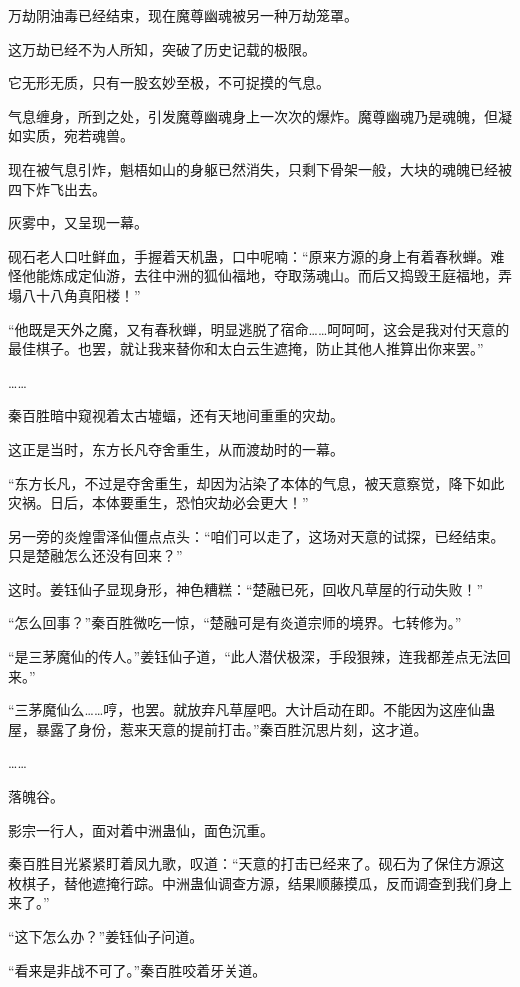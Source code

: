 \begin{this_body}
万劫阴油毒已经结束，现在魔尊幽魂被另一种万劫笼罩。

这万劫已经不为人所知，突破了历史记载的极限。

它无形无质，只有一股玄妙至极，不可捉摸的气息。

气息缠身，所到之处，引发魔尊幽魂身上一次次的爆炸。魔尊幽魂乃是魂魄，但凝如实质，宛若魂兽。

现在被气息引炸，魁梧如山的身躯已然消失，只剩下骨架一般，大块的魂魄已经被四下炸飞出去。

灰雾中，又呈现一幕。

砚石老人口吐鲜血，手握着天机蛊，口中呢喃：“原来方源的身上有着春秋蝉。难怪他能炼成定仙游，去往中洲的狐仙福地，夺取荡魂山。而后又捣毁王庭福地，弄塌八十八角真阳楼！”

“他既是天外之魔，又有春秋蝉，明显逃脱了宿命……呵呵呵，这会是我对付天意的最佳棋子。也罢，就让我来替你和太白云生遮掩，防止其他人推算出你来罢。”

……

秦百胜暗中窥视着太古墟蝠，还有天地间重重的灾劫。

这正是当时，东方长凡夺舍重生，从而渡劫时的一幕。

“东方长凡，不过是夺舍重生，却因为沾染了本体的气息，被天意察觉，降下如此灾祸。日后，本体要重生，恐怕灾劫必会更大！”

另一旁的炎煌雷泽仙僵点点头：“咱们可以走了，这场对天意的试探，已经结束。只是楚融怎么还没有回来？”

这时。姜钰仙子显现身形，神色糟糕：“楚融已死，回收凡草屋的行动失败！”

“怎么回事？”秦百胜微吃一惊，“楚融可是有炎道宗师的境界。七转修为。”

“是三茅魔仙的传人。”姜钰仙子道，“此人潜伏极深，手段狠辣，连我都差点无法回来。”

“三茅魔仙么……哼，也罢。就放弃凡草屋吧。大计启动在即。不能因为这座仙蛊屋，暴露了身份，惹来天意的提前打击。”秦百胜沉思片刻，这才道。

……

落魄谷。

影宗一行人，面对着中洲蛊仙，面色沉重。

秦百胜目光紧紧盯着凤九歌，叹道：“天意的打击已经来了。砚石为了保住方源这枚棋子，替他遮掩行踪。中洲蛊仙调查方源，结果顺藤摸瓜，反而调查到我们身上来了。”

“这下怎么办？”姜钰仙子问道。

“看来是非战不可了。”秦百胜咬着牙关道。


\end{this_body}
